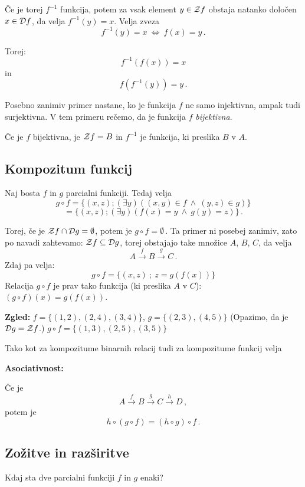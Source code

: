 \documentclass[11pt,paper=b5,DIV=13,headinclude,footinclude]{scrbook}
\def\inn {{~\wedge~}}
\def\cee {{~\Leftrightarrow~}}
\begin{document}
Če je torej $f^{-1}$ funkcija, potem za vsak element $y\in {\cal Z}f$  obstaja natanko določen $x\in {\cal D}f$, da velja
$f^{-1}(y) = x$. Velja zveza
$$f^{-1}(y) = x\cee f(x) = y\,.$$

Torej: $$f^{-1}(f(x)) = x$$
in
$$f(f^{-1}(y)) = y\,.$$

Posebno zanimiv primer nastane, ko je funkcija $f$ ne samo injektivna, ampak tudi surjektivna. V tem primeru rečemo, da je funkcija $f$ {\em bijektivna}.

Če je $f$ bijektivna, je ${\cal Z}f = B$ in $f^{-1}$ je funkcija, ki preslika $B$ v $A$.


%

\subsection{Kompozitum funkcij}

Naj bosta $f$ in $g$ parcialni funkciji. Tedaj velja
$$g\circ f = \{(x,z);(\exists y)((x,y)\in f\inn (y,z)\in g)\}$$
$$= \{(x,z);(\exists y)(f(x) = y \inn g(y) = z)\}\,.$$

Torej, če je ${\cal Z}f\cap {\cal D}g = \emptyset$, potem je $g\circ f = \emptyset\,.$ Ta primer ni posebej zanimiv, zato po navadi zahtevamo: ${\cal Z}f\subseteq {\cal D}g$, torej obstajajo take množice $A$, $B$, $C$, da velja $$A\overset{f}{\to} B\overset{g}{\to} C\,.$$ Zdaj pa velja:
$$g\circ f = \{(x,z)~;~z = g(f(x))\}$$
Relacija $g\circ f$ je prav tako funkcija (ki preslika $A$ v $C$): $(g\circ f)(x) = g(f(x))$.

\bigskip
\textbf{ Zgled:} $f = \{(1,2),(2,4),(3,4)\}$, $g = \{(2,3),(4,5)\}$
(Opazimo, da je ${\cal D}g = {\cal Z}f$.)
$g\circ f = \{(1,3),(2,5), (3,5)\}$

\bigskip
Tako kot za kompozitume binarnih relacij tudi za kompozitume funkcij velja

\medskip
\textbf{ Asociativnost:}

Če je
$$A\overset{f}{\to} B\overset{g}{\to} C\overset{h}{\to} D\,,$$
potem je
$$h\circ (g\circ f) = (h\circ g)\circ f\,.$$

\subsection{Zožitve in razširitve}
Kdaj sta dve parcialni funkciji $f$ in $g$ enaki?
\end{document}
